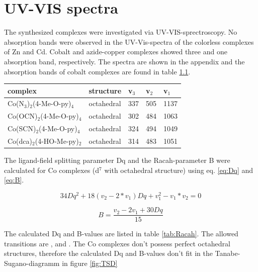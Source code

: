 \chapter{UV-VIS spectra}

The synthesized complexes were investigated via UV-VIS-sprectroscopy. No absorption bands were observed in the UV-Vis-spectra of the colorless complexes of Zn and Cd. Cobalt and azide-copper complexes showed three and one absorption band, respectively. The spectra are shown in  the appendix  and the absorption bands of cobalt complexes are found in table \ref{tab:absorp}.\\


\begin{table}[htpb!]
\centering
{}
\begin{tabular}{|l|l|l|l|l|}
\hline
complex & structure & v$_3$ & v$_2$ & v$_1$\\
\hline
Co(N$_3$)$_2$(4-Me-O-py)$_4$ & octahedral & 337 & 505 & 1137\\
\hline
Co(OCN)$_2$(4-Me-O-py)$_4$ & octahedral & 302 & 484 & 1063\\
\hline
Co(SCN)$_2$(4-Me-O-py)$_4$ & octahedral & 324 & 494 & 1049\\
\hline
Co(dca)$_2$(4-HO-Me-py)$_2$ & octahedral &  314 & 483 & 1051\\
\hline
\end{tabular}
\label{tab:absorp}
\end{table}











 The ligand-field  splitting parameter Dq and the Racah-parameter B \cite{racah} were calculated for  Co complexes (d$^7$ with octahedral structure) using eq. \ref{eq:Dq} and \ref{eq:B}.


\begin{equation}
34 Dq^2 + 18 (v_2-2*v_1) Dq + v_{1}^{2}-v_1 * v_2 = 0
\label{eq:Dq}
\end{equation}

\begin{equation}
B = \frac{v_2 - 2 v_1 +30 Dq}{15}
\label{eq:B}
\end{equation}

The calculated Dq and B-values are listed  in table \ref{tab:Racah}.
The allowed transitions are ,   and . The Co complexes don't possess perfect octahedral structures, therefore the calculated Dq and B-values don't fit in the Tanabe-Sugano-diagramm in figure \ref{fig:TSD}

